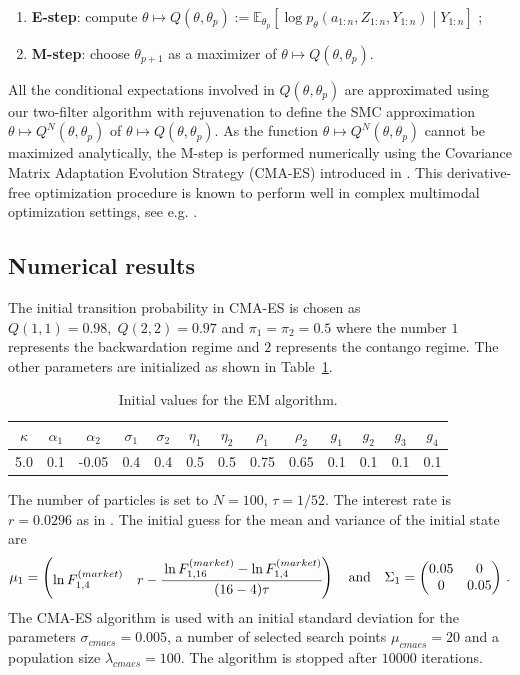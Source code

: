 \documentclass[nolayout]{article}
\theoremstyle{plain}
\theoremstyle{definition}
\newcommand{\1}{\mathbbm{1}}
\def\eqsp{\,}
\newcommand{\eqdef}{\ensuremath{:=}}
\begin{document}
\begin{enumerate}
	\item {\bf E-step}: compute $\theta \mapsto Q(\theta,\theta_{p})\eqdef \mathbb{E}_{\theta_p}\left[\log p_{\theta}(a_{1:n},Z_{1:n},Y_{1:n})\middle|Y_{1:n}\right]$ ;
	\item {\bf M-step}: choose $\theta_{p+1}$ as a maximizer of $\theta \mapsto Q(\theta,\theta_{p})$.
\end{enumerate}
All the conditional expectations involved in $Q(\theta,\theta_p)$ are approximated using our two-filter algorithm with rejuvenation to define the SMC approximation  $\theta\mapsto Q^N(\theta,\theta_p)$ of $\theta\mapsto Q(\theta,\theta_p)$. As the function $\theta\mapsto Q^N(\theta,\theta_p)$ cannot be maximized analytically, the M-step is performed numerically using the Covariance Matrix Adaptation Evolution Strategy (CMA-ES) introduced in \cite{hansen:ostermeier:2001}. This derivative-free optimization procedure is known to perform well in complex multimodal optimization settings, see e.g. \cite{hansen:kern:2004}.

\subsection{Numerical results}
The initial transition probability in CMA-ES is chosen as $Q(1,1) = 0.98, \; Q(2,2) = 0.97$ and $\pi_1 = \pi_2 = 0.5$ where the number $1$ represents the backwardation regime and $2$ represents the contango regime. The other parameters are initialized as shown in Table~\ref{fig:CMEinitialestimates}.
\begin{table}[h!]
	\centering
	\begin{tabular}{||c|c|c|c|c|c|c|c|c|c|c|c|c||}
		$\kappa$ & $\alpha_1$ & $\alpha_2$ & $\sigma_1$ & $\sigma_2$ & $\eta_1$ & $\eta_2$ & $\rho_1$ & $\rho_2$ & $g_1$ & $g_2$ & $g_3$ & $g_4$ \\
		\hline
		5.0 & 0.1 & -0.05 & 0.4 & 0.4 & 0.5 & 0.5 & 0.75 & 0.65 & 0.1 & 0.1 & 0.1 & 0.1
	\end{tabular}
	\caption{Initial values for the EM algorithm.}
	\label{fig:CMEinitialestimates}
\end{table}
The number of particles is set to $N = 100$, $\tau  = 1/52$. 
The interest rate is $r = 0.0296$ as in \cite{almansour:2016}. The initial guess for the mean and variance of the initial state are
\[
\mu_1 = \begin{pmatrix} \ln F^{(market)}_{1,4} & r-\cfrac{\ln F^{(market)}_{1,16}-\ln F^{(market)}_{1,4}}{(16-4)\tau} \end{pmatrix}\quad \mbox{and}\quad \Sigma_1 = \begin{pmatrix} 0.05 & 0 \\ 0 & 0.05 \end{pmatrix}\eqsp.
\]
The CMA-ES algorithm is used with an initial standard deviation for the parameters $\sigma_{cmaes} = 0.005$, a number of selected search points $\mu_{cmaes} = 20$ and a population size $\lambda_{cmaes} = 100$. The algorithm is stopped after $10000$ iterations.
\end{document}
